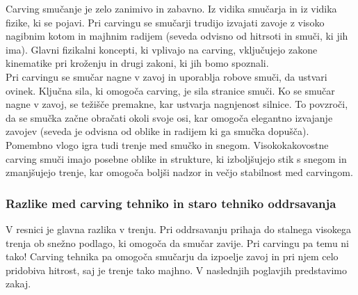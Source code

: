 \documentclass{article}
\begin{document}
Carving smučanje je zelo zanimivo in zabavno. Iz vidika smučarja in iz vidika fizike, ki se pojavi.
Pri carvingu se smučarji trudijo izvajati zavoje z visoko nagibnim kotom in majhnim radijem (seveda odvisno od hitrsoti in smuči, ki jih ima). 
Glavni fizikalni koncepti, ki vplivajo na carving, vključujejo zakone kinematike pri kroženju in drugi zakoni, ki jih bomo spoznali. \\ \newline
Pri carvingu se smučar nagne v zavoj in uporablja robove smuči, da ustvari ovinek. Ključna sila, 
ki omogoča carving, je sila stranice smuči. Ko se smučar nagne v zavoj, se težišče premakne, kar ustvarja nagnjenost silnice. 
To povzroči, da se smučka začne obračati okoli svoje osi, kar omogoča elegantno izvajanje zavojev (seveda je odvisna od oblike in radijem ki ga smučka dopušča).\\ \newline
Pomembno vlogo igra tudi trenje med smučko in snegom. Visokokakovostne carving smuči imajo posebne oblike in strukture, 
ki izboljšujejo stik s snegom in zmanjšujejo trenje, kar omogoča boljši nadzor in večjo stabilnost med carvingom.

\subsubsection*{Razlike med carving tehniko in staro tehniko oddrsavanja}

V resnici je glavna razlika v trenju. Pri oddrsavanju prihaja do stalnega visokega trenja ob snežno podlago, ki omogoča da smučar zavije.
Pri carvingu pa temu ni tako! Carving tehnika pa omogoča smučarju da izpoelje zavoj in pri njem celo pridobiva hitrost, saj je trenje tako majhno. 
V naslednjih poglavjih predstavimo zakaj.
\end{document}
